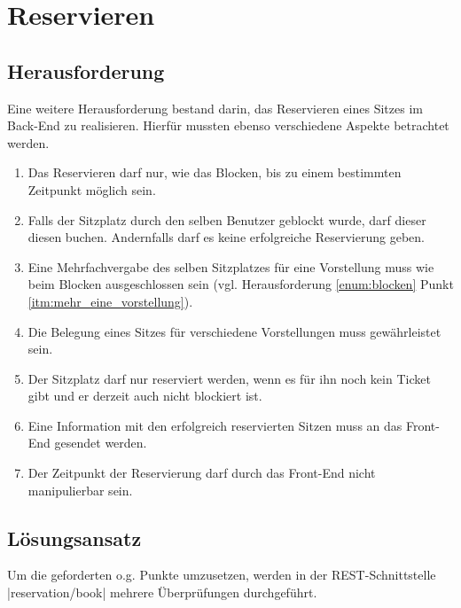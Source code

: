 \section{Reservieren}
\label{sec:reservieren}

\subsection{Herausforderung}
\label{ssec:herausforderung_reservieren}

Eine weitere Herausforderung bestand darin, das Reservieren eines Sitzes im Back-End zu realisieren.
Hierfür mussten ebenso verschiedene Aspekte betrachtet werden.

\begin{enumerate}
	\label{enum:reservieren}
	\item \label{itm:zeitpunkt_reservieren}Das Reservieren darf nur, wie das Blocken, bis zu einem bestimmten Zeitpunkt möglich sein.
	\item \label{itm:geblockt_durch_benutzer} Falls der Sitzplatz durch den selben Benutzer geblockt wurde, darf dieser diesen buchen.
	Andernfalls darf es keine erfolgreiche Reservierung geben.
	\item \label{itm:mehr_eine_vorstellung_reservieren}Eine Mehrfachvergabe des selben Sitzplatzes für eine Vorstellung muss wie beim Blocken ausgeschlossen sein (vgl. Herausforderung \ref{enum:blocken} Punkt \ref{itm:mehr_eine_vorstellung}).
	\item \label{itm:mehr_mehrere_vorstellungen_reservieren}Die Belegung eines Sitzes für verschiedene Vorstellungen muss gewährleistet sein.
	\item \label{itm:ticket_reservieren} Der Sitzplatz darf nur reserviert werden, wenn es für ihn noch kein Ticket gibt und er derzeit auch nicht blockiert ist.
	\item \label{itm:front_end_reservieren} Eine Information mit den erfolgreich reservierten Sitzen muss an das Front-End gesendet werden.
	\item \label{itm:zeit_reservieren} Der Zeitpunkt der Reservierung darf durch das Front-End nicht manipulierbar sein.
\end{enumerate}

\subsection{Lösungsansatz}
\label{ssec:loesung_reservieren}

Um die geforderten o.g. Punkte umzusetzen, werden in der \acs{REST}-Schnittstelle \jinline |reservation/book| mehrere Überprüfungen durchgeführt.

